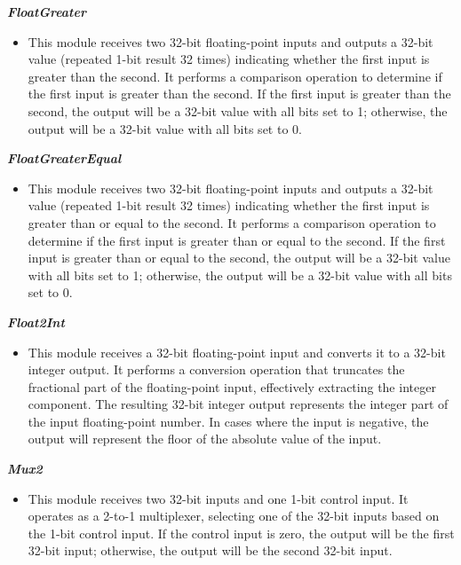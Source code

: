 \vspace{0.5cm}

\textbf{\textit{FloatGreater}}
\begin{itemize}
\item  This module receives two 32-bit floating-point inputs and outputs a 32-bit value (repeated 1-bit result 32 times) indicating whether the first input is greater than the second. It performs a comparison operation to determine if the first input is greater than the second.
If the first input is greater than the second, the output will be a 32-bit value with all bits set to 1; otherwise, the output will be a 32-bit value with all bits set to 0.
\end{itemize}

\vspace{0.5cm}

\textbf{\textit{FloatGreaterEqual}}
\begin{itemize}
\item  This module receives two 32-bit floating-point inputs and outputs a 32-bit value (repeated 1-bit result 32 times) indicating whether the first input is greater than or equal to the second. It performs a comparison operation to determine if the first input is greater than or equal to the second.
If the first input is greater than or equal to the second, the output will be a 32-bit value with all bits set to 1; otherwise, the output will be a 32-bit value with all bits set to 0.
\end{itemize}

\vspace{0.5cm}

\textbf{\textit{Float2Int}}
\begin{itemize}
\item  This module receives a 32-bit floating-point input and converts it to a 32-bit integer output. It performs a conversion operation that truncates the fractional part of the floating-point input, effectively extracting the integer component. The resulting 32-bit integer output represents the integer part of the input floating-point number. In cases where the input is negative, the output will represent the floor of the absolute value of the input.
\end{itemize}

\vspace{0.5cm}

\textbf{\textit{Mux2}}
\begin{itemize}
\item  This module receives two 32-bit inputs and one 1-bit control input. It operates as a 2-to-1 multiplexer, selecting one of the 32-bit inputs based on the 1-bit control input. 
If the control input is zero, the output will be the first 32-bit input; otherwise, the output will be the second 32-bit input.
\end{itemize}

